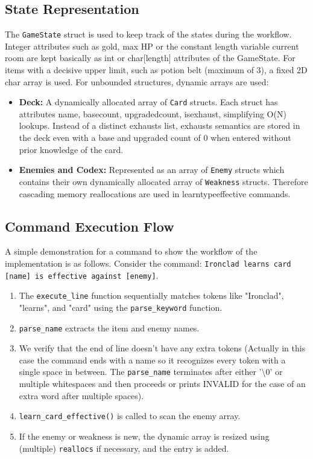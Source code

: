 \documentclass[a4paper,12pt]{article}
\begin{document}
\subsection{State Representation}

The \texttt{GameState} struct is used to keep track of the states during the workflow. Integer attributes such as gold, max HP or the constant length variable current room are kept basically as int or char[length] attributes of the GameState. For items with a decisive upper limit, such as potion belt (maximum of 3), a fixed 2D char array is used. For unbounded structures, dynamic arrays are used:
\begin{itemize}[leftmargin=1.5em]
    \item \textbf{Deck:} A dynamically allocated array of \texttt{Card} structs. Each struct has attributes name, base\textunderscore count, upgraded\textunderscore count, is\textunderscore exhaust, simplifying O(N) lookups. Instead of a distinct exhausts list, exhausts semantics are stored in the deck even with a base and upgraded count of 0 when entered without prior knowledge of the card.
    \item \textbf{Enemies and Codex:} Represented as an array of \texttt{Enemy} structs which contains their own dynamically allocated array of \texttt{Weakness} structs. Therefore cascading memory reallocations are used in learn\textunderscore type\textunderscore effective commands.
\end{itemize}

\subsection{Command Execution Flow}
A simple demonstration for a command to show the workflow of the implementation is as follows. Consider the command: \texttt{Ironclad learns card [name] is effective against [enemy]}.
\begin{enumerate}[leftmargin=1.5em]
    \item The \texttt{execute\_line} function sequentially matches tokens like "Ironclad", "learns", and "card" using the \texttt{parse\_keyword} function.
    \item \texttt{parse\_name} extracts the item and enemy names.
    \item We verify that the end of line doesn't have any extra tokens (Actually in this case the command ends with a name so it recognizes every token with a single space in between. The \texttt{parse\_name} terminates after either '\textbackslash 0' or multiple whitespaces and then proceeds or prints INVALID for the case of an extra word after multiple spaces).
    \item \texttt{learn\_card\_effective()} is called to scan the enemy array.
    \item If the enemy or weakness is new, the dynamic array is resized using (multiple) \texttt{reallocs} if necessary, and the entry is added.
\end{enumerate}
\end{document}
